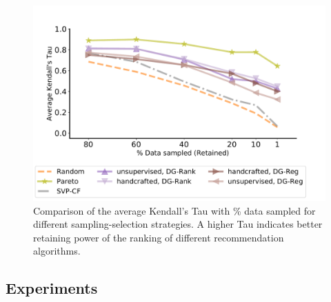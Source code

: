 \begin{figure} \centering
\begin{minipage}{0.47\textwidth}
    \centering
    \captionsetup{type=table} %
    
\end{minipage} \hspace{0.8cm} %
\begin{minipage}{0.46\textwidth}
    \centering
    \vspace{-0.5cm}
    \includegraphics[width=0.86\linewidth]{figures/oracle_tau_vs_sampling_percent.pdf}
    \vspace{-0.1cm}
    \caption{Comparison of the average Kendall's Tau with \% data sampled for different sampling-selection strategies. A higher Tau indicates better retaining power of the ranking of different recommendation algorithms.}
    \label{percent_sampling_vs_tau_oracle}
\end{minipage}
\end{figure} 

\subsection{Experiments}

